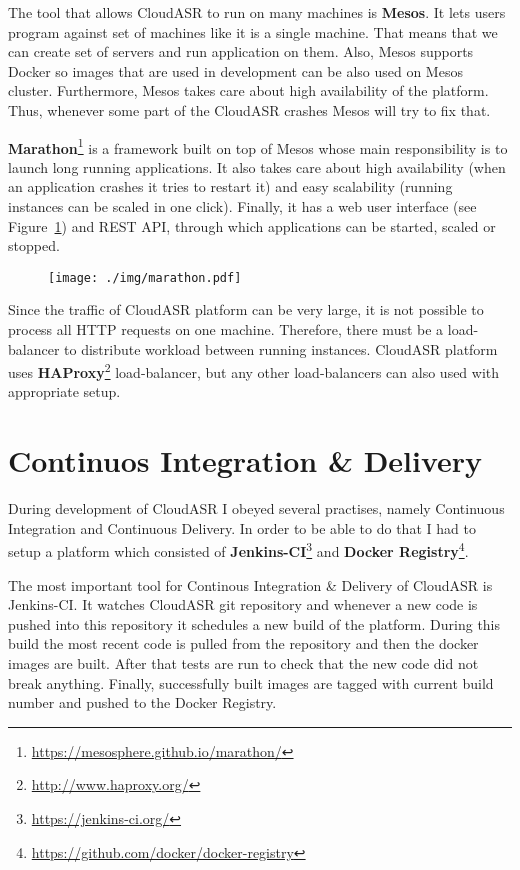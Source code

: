 The tool that allows CloudASR to run on many machines is \textbf{Mesos}.
It lets users program against set of machines like it is a single machine.
That means that we can create set of servers and run application on them.
Also, Mesos supports Docker so images that are used in development can be also used on Mesos cluster.
Furthermore, Mesos takes care about high availability of the platform.
Thus, whenever some part of the CloudASR crashes Mesos will try to fix that.

\textbf{Marathon}\footnote{\url{https://mesosphere.github.io/marathon/}} is a framework built on top of Mesos whose main responsibility is to launch long running applications.
It also takes care about high availability (when an application crashes it tries to restart it)
  and easy scalability (running instances can be scaled in one click).
Finally, it has a web user interface (see Figure~\ref{fig:marathon}) and REST API,
  through which applications can be started, scaled or stopped.

\begin{figure}
  \centering
  \texttt{[image: ./img/marathon.pdf]}

  \label{fig:marathon}
  \caption{}
\end{figure}

Since the traffic of CloudASR platform can be very large,
  it is not possible to process all HTTP requests on one machine.
Therefore, there must be a load-balancer to distribute workload between running instances.
CloudASR platform uses \textbf{HAProxy}\footnote{\url{http://www.haproxy.org/}} load-balancer,
  but any other load-balancers can also used with appropriate setup.


\section{Continuos Integration \& Delivery}
During development of CloudASR I obeyed several practises,
  namely Continuous Integration and Continuous Delivery.
In order to be able to do that I had to setup a platform which consisted of \textbf{Jenkins-CI}\footnote{\url{https://jenkins-ci.org/}} and \textbf{Docker Registry}\footnote{\url{https://github.com/docker/docker-registry}}.

The most important tool for Continous Integration \& Delivery of CloudASR is Jenkins-CI.
It watches CloudASR git repository
  and whenever a new code is pushed into this repository it schedules a new build of the platform.
During this build the most recent code is pulled from the repository and then the docker images are built.
After that tests are run to check that the new code did not break anything.
Finally, successfully built images are tagged with current build number and pushed to the Docker Registry.


